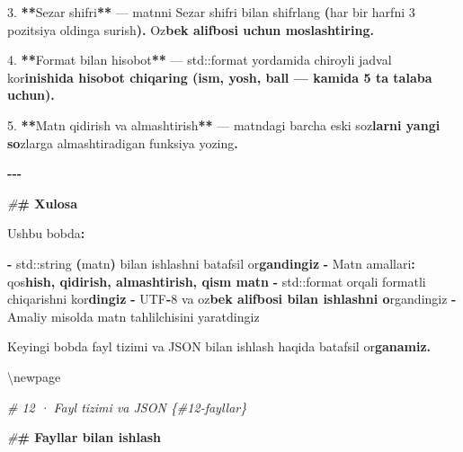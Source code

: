 \documentclass[a4paper,11pt,twoside,openright]{book}
\newenvironment{Shaded}{\begin{snugshade}}{\end{snugshade}}
\newcommand{\BuiltInTok}[1]{#1}
\newcommand{\CharTok}[1]{\textcolor[rgb]{0.31,0.60,0.02}{#1}}
\newcommand{\DecValTok}[1]{\textcolor[rgb]{0.00,0.00,0.81}{#1}}
\newcommand{\ErrorTok}[1]{\textcolor[rgb]{0.64,0.00,0.00}{\textbf{#1}}}
\newcommand{\FloatTok}[1]{\textcolor[rgb]{0.00,0.00,0.81}{#1}}
\newcommand{\NormalTok}[1]{#1}
\newcommand{\OperatorTok}[1]{\textcolor[rgb]{0.81,0.36,0.00}{\textbf{#1}}}
\newcommand{\PreprocessorTok}[1]{\textcolor[rgb]{0.56,0.35,0.01}{\textit{#1}}}
\begin{document}
\begin{Shaded}
\begin{Highlighting}[]
\FloatTok{3.} \OperatorTok{**}\NormalTok{Sezar shifri}\OperatorTok{**}\NormalTok{ — matnni Sezar shifri bilan shifrlang }\OperatorTok{(}\NormalTok{har bir harfni }\DecValTok{3}\NormalTok{ pozitsiya oldinga surish}\OperatorTok{).}\NormalTok{ O}\CharTok{\textquotesingle{}z}\ErrorTok{bek alifbosi uchun moslashtiring.}

\FloatTok{4.} \OperatorTok{**}\NormalTok{Format bilan hisobot}\OperatorTok{**}\NormalTok{ — }\ErrorTok{\textasciigrave{}}\BuiltInTok{std::}\NormalTok{format}\ErrorTok{\textasciigrave{}}\NormalTok{ yordamida chiroyli jadval ko}\CharTok{\textquotesingle{}r}\ErrorTok{inishida hisobot chiqaring (ism, yosh, ball — kamida 5 ta talaba uchun).}

\FloatTok{5.} \OperatorTok{**}\NormalTok{Matn qidirish va almashtirish}\OperatorTok{**}\NormalTok{ — matndagi barcha eski so}\CharTok{\textquotesingle{}z}\ErrorTok{larni yangi so}\CharTok{\textquotesingle{}}\NormalTok{zlarga almashtiradigan funksiya yozing}\OperatorTok{.}

\OperatorTok{{-}{-}{-}}

\PreprocessorTok{\#}\ErrorTok{\# Xulosa}

\NormalTok{Ushbu bobda}\OperatorTok{:}

\OperatorTok{{-}} \ErrorTok{\textasciigrave{}}\BuiltInTok{std::}\NormalTok{string}\ErrorTok{\textasciigrave{}} \OperatorTok{(}\NormalTok{matn}\OperatorTok{)}\NormalTok{ bilan ishlashni batafsil o}\CharTok{\textquotesingle{}r}\ErrorTok{gandingiz}
\OperatorTok{{-}}\NormalTok{ Matn amallari}\OperatorTok{:}\NormalTok{ qo}\CharTok{\textquotesingle{}s}\ErrorTok{hish, qidirish, almashtirish, qism matn}
\OperatorTok{{-}} \ErrorTok{\textasciigrave{}}\BuiltInTok{std::}\NormalTok{format}\ErrorTok{\textasciigrave{}}\NormalTok{ orqali formatli chiqarishni ko}\CharTok{\textquotesingle{}r}\ErrorTok{dingiz}
\OperatorTok{{-}}\NormalTok{ UTF}\OperatorTok{{-}}\DecValTok{8}\NormalTok{ va o}\CharTok{\textquotesingle{}z}\ErrorTok{bek alifbosi bilan ishlashni o}\CharTok{\textquotesingle{}}\NormalTok{rgandingiz}
\OperatorTok{{-}}\NormalTok{ Amaliy misolda matn tahlilchisini yaratdingiz}

\NormalTok{Keyingi bobda fayl tizimi va JSON bilan ishlash haqida batafsil o}\CharTok{\textquotesingle{}r}\ErrorTok{ganamiz.}


\NormalTok{\textbackslash{}newpage}

\PreprocessorTok{\# 12 · Fayl tizimi va JSON \{\#12{-}fayllar\}}

\PreprocessorTok{\#}\ErrorTok{\# Fayllar bilan ishlash}


\end{Highlighting}
\end{Shaded}
\end{document}
